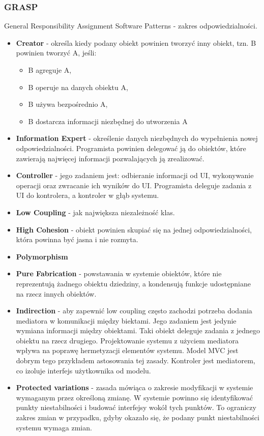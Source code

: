 \documentclass[a4paper]{article}
\begin{document}
    \subsubsection{GRASP}
    General Responsibility Assignment Software Patterns - zakres odpowiedzialności.
    \begin{itemize}
        \item \textbf{Creator} - określa kiedy podany obiekt powinien tworzyć inny obiekt, tzn. B powinien tworzyć A, jeśli:
        \begin{itemize}
            \item B agreguje A,
            \item B operuje na danych obiektu A,
            \item B używa bezpośrednio A,
            \item B dostarcza informacji niezbędnej do utworzenia A
        \end{itemize}
        \item \textbf{Information Expert} - określenie danych niezbędnych do wypełnienia nowej odpowiedzialności. Programista powinien delegować ją do obiektów, które
        zawierają najwięcej informacji pozwalających ją zrealizować.
        \item \textbf{Controller} - jego zadaniem jest: odbieranie informacji od UI, wykonywanie operacji oraz zwracanie ich wyników do UI.
        Programista deleguje zadania z UI do kontrolera, a kontroler w głąb systemu.
        \item \textbf{Low Coupling} - jak największa niezależność klas.
        \item \textbf{High Cohesion} - obiekt powinien skupiać się na jednej odpowiedzialności, która powinna być jasna i nie rozmyta.
        \item \textbf{Polymorphism}
        \item \textbf{Pure Fabrication} - powstawania w systemie obiektów, które nie reprezentują
        żadnego obiektu dziedziny, a kondensują funkcje udostępniane na rzecz innych obiektów.
        \item \textbf{Indirection} - aby zapewnić low coupling często zachodzi potrzeba
        dodania mediatora w komunikacji między biektami. Jego zadaniem jest jedynie wymiana informacji
        między obiektami. Taki obiekt deleguje zadania z jednego obiektu na rzecz drugiego. Projektowanie
        systemu z użyciem mediatora wpływa na poprawę hermetyzacji elementów systemu.
        Model MVC jest dobrym tego przykładem astosowania tej zasady. Kontroler jest mediatorem, co izoluje
        interfejs użytkownika od modelu.
        \item \textbf{Protected variations} - zasada mówiąca o zakresie modyfikacji w systemie
        wymaganym przez określoną zmianę. W systemie powinno się identyfikować punkty niestabilności i
        budować interfejsy wokół tych punktów. To ograniczy zakres zmian w przypadku, gdyby
        okazało się, że podany punkt niestabilności systemu wymaga zmian.
    \end{itemize}
\end{document}
